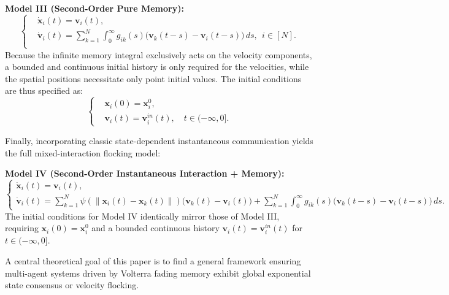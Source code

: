 \documentclass[11pt]{amsart}
\numberwithin{equation}{section}
\begin{document}
\noindent\textbf{Model III (Second-Order Pure Memory):}
\begin{equation}\label{eq:model3}
\left\{
\begin{aligned}
&\dot{\boldsymbol{x}}_i(t) = \boldsymbol{v}_i(t), \\
&\dot{\boldsymbol{v}}_i(t) = \displaystyle\sum_{k=1}^{N} \int_{0}^{\infty} g_{ik}(s)\bigl(\boldsymbol{v}_k(t-s)-\boldsymbol{v}_i(t-s)\bigr)\,ds,~~i \in [N].\\
\end{aligned}
\right.
\end{equation}
Because the infinite memory integral exclusively acts on the velocity components, a bounded and continuous initial history is only required for the velocities, while the spatial positions necessitate only point initial values. The initial conditions are thus specified as:
\begin{equation*}\label{initial-eq-model3}
\left\{
\begin{aligned}
&\boldsymbol{x}_{i}(0) = \boldsymbol{x}_{i}^{0},\\
&\boldsymbol{v}_i(t)=\boldsymbol{v}^{in}_i(t), \quad t\in(-\infty,0].
\end{aligned}
\right.
\end{equation*}

Finally, incorporating classic state-dependent instantaneous communication yields the full mixed-interaction flocking model:
\vspace{0.2cm}

\noindent\textbf{Model IV (Second-Order Instantaneous Interaction + Memory):}
{\small
\begin{equation}\label{eq:model4}
\begin{cases}
\dot{\boldsymbol{x}}_i(t) = \boldsymbol{v}_i(t), \\[4pt]
\dot{\boldsymbol{v}}_i(t) = \displaystyle\sum_{k=1}^{N} \psi(\|\boldsymbol{x}_i(t)-\boldsymbol{x}_k(t)\|) \bigl(\boldsymbol{v}_k(t)-\boldsymbol{v}_i(t)\bigr) + \sum_{k=1}^{N} \int_{0}^{\infty} g_{ik}(s)\bigl(\boldsymbol{v}_k(t-s)-\boldsymbol{v}_i(t-s)\bigr)\,ds.
\end{cases}
\end{equation}
}
The initial conditions for Model IV identically mirror those of Model III, requiring $\boldsymbol{x}_{i}(0) = \boldsymbol{x}_{i}^{0}$ and a bounded continuous history $\boldsymbol{v}_i(t)=\boldsymbol{v}^{in}_i(t)$ for $t\in(-\infty,0]$.

A central theoretical goal of this paper is to find a general framework ensuring   multi-agent systems driven by Volterra fading memory exhibit global exponential state consensus or velocity flocking.
\end{document}
